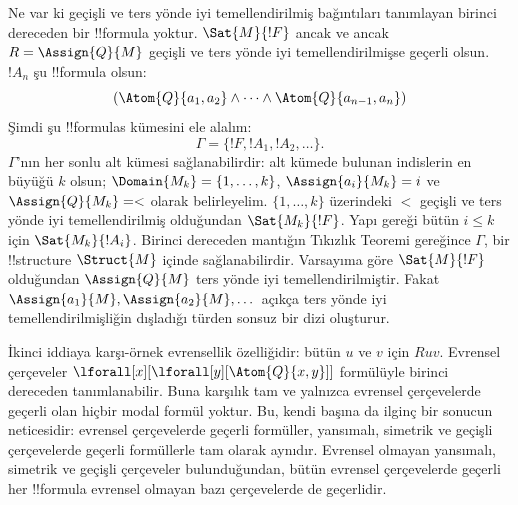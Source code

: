 Ne var ki geçişli ve ters yönde iyi temellendirilmiş bağıntıları tanımlayan
birinci dereceden bir !!{formula} yoktur. $\Sat{M}{!F}$ ancak ve ancak
$R=\Assign{Q}{M}$ geçişli ve ters yönde iyi temellendirilmişse geçerli
olsun. $!A_n$ şu !!{formula} olsun:
\[
(\Atom{Q}{a_1,a_2} \land \dots \land
    \Atom{Q}{a_{n-1},a_{n}})
\]
Şimdi şu !!{formula}s kümesini ele alalım:
\[
\Gamma=\{!F,!A_1,!A_2,\dots\}.
\]
$\Gamma$'nın her sonlu alt kümesi sağlanabilirdir: alt kümede bulunan
indislerin en büyüğü $k$ olsun; $\Domain{M_k}=\{1,\dots,k\}$,
$\Assign{a_i}{M_k}=i$ ve $\Assign{Q}{M_k}=<$ olarak belirleyelim.
$\{1,\dots,k\}$ üzerindeki $<$ geçişli ve ters yönde iyi temellendirilmiş
olduğundan $\Sat{M_k}{!F}$. Yapı gereği bütün $i\le k$ için
$\Sat{M_k}{!A_i}$. Birinci dereceden mantığın Tıkızlık Teoremi gereğince
$\Gamma$, bir !!{structure} $\Struct{M}$ içinde sağlanabilirdir. Varsayıma
göre $\Sat{M}{!F}$ olduğundan $\Assign{Q}{M}$ ters yönde iyi
temellendirilmiştir. Fakat $\Assign{a_1}{M},\Assign{a_2}{M},\dots$ açıkça
ters yönde iyi temellendirilmişliğin dışladığı türden sonsuz bir dizi
oluşturur.

İkinci iddiaya karşı-örnek evrensellik özelliğidir: bütün $u$ ve $v$ için
$Ruv$. Evrensel çerçeveler
$\lforall[x][\lforall[y][\Atom{Q}{x,y}]]$ formülüyle birinci dereceden
tanımlanabilir. Buna karşılık tam ve yalnızca evrensel çerçevelerde geçerli
olan hiçbir modal formül yoktur. Bu, kendi başına da ilginç bir sonucun
neticesidir: evrensel çerçevelerde geçerli formüller, yansımalı, simetrik ve
geçişli çerçevelerde geçerli formüllerle tam olarak aynıdır. Evrensel
olmayan yansımalı, simetrik ve geçişli çerçeveler bulunduğundan, bütün
evrensel çerçevelerde geçerli her !!{formula} evrensel olmayan bazı
çerçevelerde de geçerlidir.

